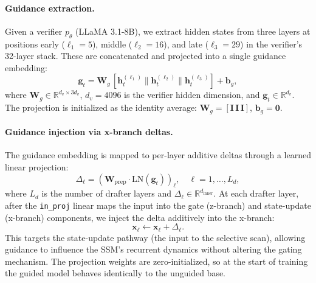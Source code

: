 \paragraph{Guidance extraction.}
Given a verifier $p_\theta$ (LLaMA 3.1-8B), we extract hidden states from three layers at positions early ($\ell_1=5$), middle ($\ell_2=16$), and late ($\ell_3=29$) in the verifier's 32-layer stack.
These are concatenated and projected into a single guidance embedding:
\begin{equation}
  \mathbf{g}_t = \mathbf{W}_g\, [\mathbf{h}_t^{(\ell_1)} \| \mathbf{h}_t^{(\ell_2)} \| \mathbf{h}_t^{(\ell_3)}] + \mathbf{b}_g,
  \label{eq:guidance_extract}
\end{equation}
where $\mathbf{W}_g \in \mathbb{R}^{d_v \times 3d_v}$, $d_v = 4096$ is the verifier hidden dimension, and $\mathbf{g}_t \in \mathbb{R}^{d_v}$.
The projection is initialized as the identity average: $\mathbf{W}_g = [\mathbf{I}\, \mathbf{I}\, \mathbf{I}]$, $\mathbf{b}_g = \mathbf{0}$.

\paragraph{Guidance injection via x-branch deltas.}
The guidance embedding is mapped to per-layer additive deltas through a learned linear projection:
\begin{equation}
  \Delta_\ell = (\mathbf{W}_{\mathrm{prep}} \cdot \mathrm{LN}(\mathbf{g}_t))_\ell, \quad \ell = 1, \ldots, L_d,
  \label{eq:prep_deltas}
\end{equation}
where $L_d$ is the number of drafter layers and $\Delta_\ell \in \mathbb{R}^{d_{\mathrm{inner}}}$.
At each drafter layer, after the \texttt{in\_proj} linear maps the input into the gate (z-branch) and state-update (x-branch) components, we inject the delta additively into the x-branch:
\begin{equation}
  \mathbf{x}_\ell \leftarrow \mathbf{x}_\ell + \Delta_\ell.
  \label{eq:inject}
\end{equation}
This targets the state-update pathway (the input to the selective scan), allowing guidance to influence the SSM's recurrent dynamics without altering the gating mechanism.
The projection weights are zero-initialized, so at the start of training the guided model behaves identically to the unguided base.

